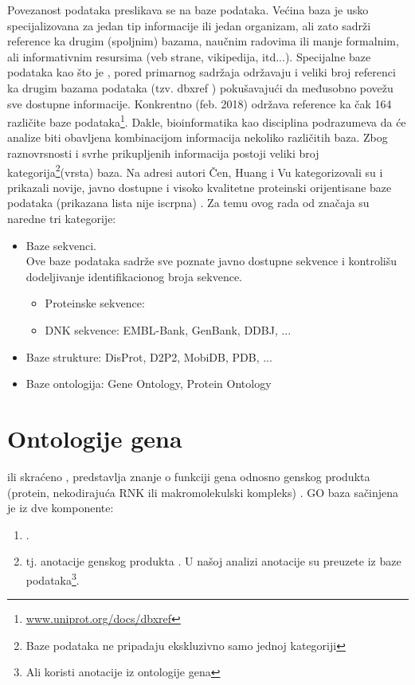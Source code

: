 Povezanost podataka preslikava se na baze podataka. Većina baza je usko specijalizovana
za jedan tip informacije ili jedan organizam, ali zato sadrži reference ka
drugim (spoljnim) bazama, naučnim radovima ili  manje formalnim, ali
informativnim resursima (veb strane, vikipedija, itd...). Specijalne baze podataka kao
što je \uniprotkb, pored primarnog sadržaja održavaju i veliki broj referenci ka
drugim bazama podataka (tzv. dbxref ) pokušavajući
da međusobno povežu sve dostupne informacije. Konkrentno \uniprotkb (feb. 2018)
održava reference ka čak 164 različite baze
podataka\footnote{\url{www.uniprot.org/docs/dbxref}}.  Dakle, bioinformatika
kao disciplina podrazumeva da će analize biti obavljena kombinacijom informacija
nekoliko različitih baza.  Zbog raznovrsnosti i svrhe prikupljenih informacija
postoji veliki broj kategorija\footnote{Baze podataka ne pripadaju ekskluzivno
samo jednoj kategoriji}(vrsta) baza. Na adresi \cite{dbSummary2015} autori Čen, Huang i Vu
kategorizovali su i prikazali novije, javno dostupne i visoko kvalitetne
proteinski orijentisane baze podataka (prikazana lista nije iscrpna) \parencite{Chen2017}.
Za temu ovog rada od značaja su naredne tri kategorije:

\begin{itemize}
  \item Baze sekvenci.\\ 
        Ove baze podataka sadrže sve poznate javno dostupne sekvence i kontrolišu dodeljivanje 
        identifikacionog broja sekvence.
    \begin{itemize}
      \item Proteinske sekvence: \uniprotkb
      \item DNK sekvence: EMBL-Bank, GenBank, DDBJ, ...
    \end{itemize}
  \item Baze strukture: DisProt, D2P2, MobiDB, PDB, ...
  \item Baze ontologija: Gene Ontology, Protein Ontology
\end{itemize}


\section{Ontologije gena}
\label{GO}

  ili skraćeno , 
predstavlja znanje o funkciji gena odnosno genskog
produkta (protein, nekodirajuća RNK ili makromolekulski kompleks)
\parencite{GO2016}.
GO baza sačinjena je iz dve komponente:
\begin{enumerate}
  \item {}.
  \item {} tj. anotacije genskog produkta . U našoj
    analizi anotacije su preuzete iz \swissprot baze podataka\footnote{Ali \swissprot koristi anotacije iz ontologije gena}.
\end{enumerate}

